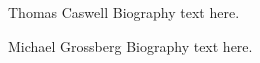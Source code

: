 \documentclass[journal]{IEEEtran}
\theoremstyle{definition}
\theoremstyle{remark}
\begin{document}
\begin{IEEEbiographynophoto}{Thomas Caswell}
  Biography text here.
\end{IEEEbiographynophoto}

\begin{IEEEbiographynophoto}{Michael Grossberg}
Biography text here.
\end{IEEEbiographynophoto}




\end{document}
